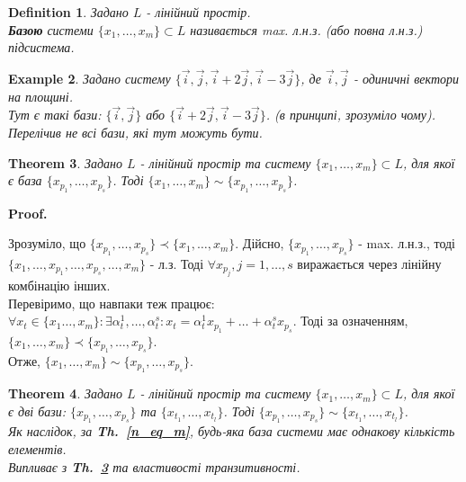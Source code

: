 \documentclass[a4paper, 10pt]{article}
\makeatletter
\theoremstyle{theoremdd}
\newtheorem{theorem}{Theorem}[subsection]
\newtheorem{definition}[theorem]{Definition}
\newtheorem{example}[theorem]{Example}
\newcommand\thref[1]{\textbf{Th.~\ref{#1}}}
\renewenvironment{proof}[1][Proof.\\]{\par
\pushQED{\hfill \qed}%
\normalfont \topsep6\p@\@plus6\p@\relax
\trivlist
\item\relax
{\bfseries
#1\@addpunct{.}}\hspace\labelsep\ignorespaces
}{%
\popQED\endtrivlist\@endpefalse
}
\makeatother
\begin{document}
	\begin{definition}
	Задано $L$ - лінійний простір.\\
	\textbf{Базою} системи $\{x_1, \dots, x_m\} \subset L$ називається max. л.н.з. (або повна л.н.з.) підсистема.
	\end{definition}
	
	\begin{example}
	Задано систему $\{\vec{i}, \vec{j}, \vec{i}+2\vec{j}, \vec{i}-3\vec{j} \}$, де $\vec{i},\vec{j}$ - одиничні вектори на площині.\\
	Тут є такі бази: $\{\vec{i},\vec{j}\}$ або $\{\vec{i}+2\vec{j},\vec{i}-3\vec{j}\}$. (в принципі, зрозуміло чому). Перелічив не всі бази, які тут можуть бути.
	\end{example}
	
	\begin{theorem}
	\label{two_bases_equivalent}
	Задано $L$ - лінійний простір та систему $\{x_1, \dots, x_m\} \subset L$, для якої є база $\{x_{p_1}, \dots, x_{p_s}\}$. Тоді $\{x_1, \dots, x_m\} \sim \{x_{p_1}, \dots, x_{p_s}\}$.
	\end{theorem}
	
	\begin{proof}
	Зрозуміло, що $\{x_{p_1}, \dots, x_{p_s} \} \prec \{x_1, \dots, x_m \}$. Дійсно, $\{x_{p_1}, \dots, x_{p_s}\}$ - max. л.н.з., тоді $\{x_1,\dots,x_{p_1},\dots,x_{p_s},\dots,x_m\}$ - л.з. Тоді $\forall x_{p_j}, j=1,\dots,s$ виражається через лінійну комбінацію інших.\\
	Перевіримо, що навпаки теж працює:\\
	$\forall x_t \in \{x_1 \dots, x_m\}: \exists \alpha^1_t, \dots, \alpha^s_t: x_t = \alpha^1_t x_{p_1} + \dots + \alpha^s_t x_{p_s}$. Тоді за означенням, $\{x_1, \dots, x_m \} \prec \{x_{p_1}, \dots, x_{p_s} \}$.\\
	Отже, $\{x_1, \dots, x_m \} \sim \{x_{p_1}, \dots, x_{p_s} \}$.
	\end{proof}
	
	\begin{theorem}
	Задано $L$ - лінійний простір та систему $\{x_1, \dots, x_m\} \subset L$, для якої є дві бази: $\{x_{p_1}, \dots, x_{p_s}\}$ та $\{x_{t_1}, \dots, x_{t_l}\}$. Тоді
	$\{x_{p_1}, \dots, x_{p_s}\} \sim \{x_{t_1}, \dots, x_{t_l}\}$.\\
	Як наслідок, за \thref{n_eq_m}, будь-яка база системи має однакову кількість елементів.\\
	\textit{Випливає з} \thref{two_bases_equivalent} \textit{та властивості транзитивності.}
	\end{theorem}
	
\end{document}
